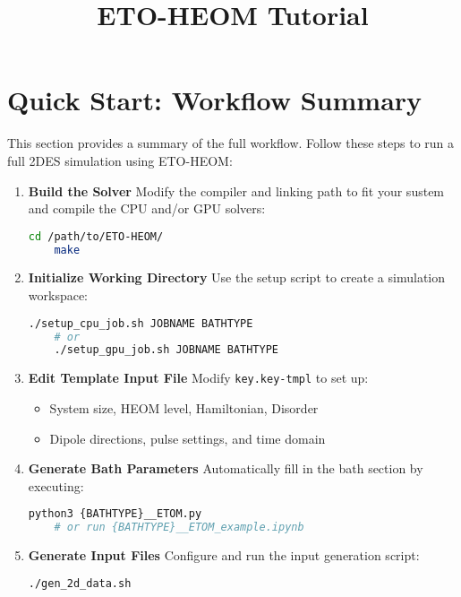 \documentclass{article}
\title{ETO-HEOM Tutorial}
\begin{document}
\maketitle

\section*{Quick Start: Workflow Summary}

This section provides a summary of the full workflow. Follow these steps to run a full 2DES simulation using ETO-HEOM:

\begin{enumerate}
    \item \textbf{Build the Solver}  
    Modify the compiler and linking path to fit your sustem and compile the CPU and/or GPU solvers:
    \begin{lstlisting}[language=bash]
    cd /path/to/ETO-HEOM/
    make
    \end{lstlisting}

    \item \textbf{Initialize Working Directory}  
    Use the setup script to create a simulation workspace:
    \begin{lstlisting}[language=bash]
    ./setup_cpu_job.sh JOBNAME BATHTYPE
    # or
    ./setup_gpu_job.sh JOBNAME BATHTYPE
    \end{lstlisting}

    \item \textbf{Edit Template Input File}  
    Modify \texttt{key.key-tmpl} to set up:
    \begin{itemize}
        \item System size, HEOM level, Hamiltonian, Disorder
        \item Dipole directions, pulse settings, and time domain
    \end{itemize}

    \item \textbf{Generate Bath Parameters}  
    Automatically fill in the bath section by executing:
    \begin{lstlisting}[language=bash]
    python3 {BATHTYPE}__ETOM.py
    # or run {BATHTYPE}__ETOM_example.ipynb
    \end{lstlisting}

    \item \textbf{Generate Input Files}  
    Configure and run the input generation script:
    \begin{lstlisting}[language=bash]
    ./gen_2d_data.sh
    \end{lstlisting}


\end{enumerate}
\end{document}
